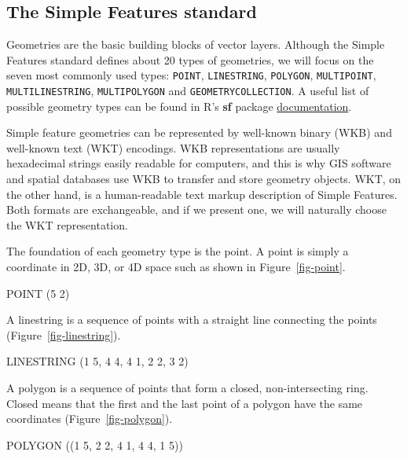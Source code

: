 \documentclass[
  letterpaper,
]{krantz}
\newenvironment{Shaded}{\begin{snugshade}}{\end{snugshade}}
\newcommand{\NormalTok}[1]{\textcolor[rgb]{0.00,0.23,0.31}{#1}}
\begin{document}
\subsection{The Simple Features standard}\label{sec-simple-features}

Geometries are the basic building blocks of vector layers. Although the
Simple Features standard defines about 20 types of geometries, we will
focus on the seven most commonly used types: \texttt{POINT},
\texttt{LINESTRING}, \texttt{POLYGON}, \texttt{MULTIPOINT},
\texttt{MULTILINESTRING}, \texttt{MULTIPOLYGON} and
\texttt{GEOMETRYCOLLECTION}. A useful list of possible geometry types
can be found in R's \textbf{sf} package
\href{https://r-spatial.github.io/sf/articles/sf1.html\#simple-feature-geometry-types}{documentation}.

Simple feature geometries can be represented by well-known binary (WKB)
and well-known text (WKT) encodings. WKB representations are usually
hexadecimal strings easily readable for computers, and this is why GIS
software and spatial databases use WKB to transfer and store geometry
objects. WKT, on the other hand, is a human-readable text markup
description of Simple Features. Both formats are exchangeable, and if we
present one, we will naturally choose the WKT representation.

The foundation of each geometry type is the point. A point is simply a
coordinate in 2D, 3D, or 4D space such as shown in
Figure~\ref{fig-point}.

\begin{Shaded}
\begin{Highlighting}[]
\NormalTok{POINT (5 2)}
\end{Highlighting}
\end{Shaded}

A linestring is a sequence of points with a straight line connecting the
points (Figure~\ref{fig-linestring}).

\begin{Shaded}
\begin{Highlighting}[]
\NormalTok{LINESTRING (1 5, 4 4, 4 1, 2 2, 3 2)}
\end{Highlighting}
\end{Shaded}

A polygon is a sequence of points that form a closed, non-intersecting
ring. Closed means that the first and the last point of a polygon have
the same coordinates (Figure~\ref{fig-polygon}).

\begin{Shaded}
\begin{Highlighting}[]
\NormalTok{POLYGON ((1 5, 2 2, 4 1, 4 4, 1 5))}
\end{Highlighting}
\end{Shaded}
\end{document}
